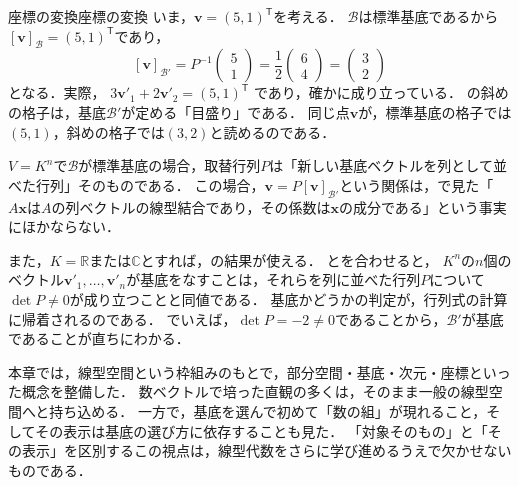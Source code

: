 \begin{example}{座標の変換}{座標の変換}
  いま，$\bm{v} = (5,1)^\mathsf{T}$を考える．
  $\mathcal{B}$は標準基底であるから$[\bm{v}]_{\mathcal{B}} = (5,1)^\mathsf{T}$であり，
  \[
    [\bm{v}]_{\mathcal{B}'}
    = P^{-1}\begin{pmatrix} 5 \\ 1 \end{pmatrix}
    = \frac{1}{2}\begin{pmatrix} 6 \\ 4 \end{pmatrix}
    = \begin{pmatrix} 3 \\ 2 \end{pmatrix}
  \]
  となる．実際，
  $3\bm{v}'_1 + 2\bm{v}'_2 = (5,1)^\mathsf{T}$
  であり，確かに成り立っている．
  の斜めの格子は，基底$\mathcal{B}'$が定める「目盛り」である．
  同じ点$\bm{v}$が，標準基底の格子では$(5,1)$，斜めの格子では$(3,2)$と読めるのである．
\end{example}

\begin{remark}[標準基底の場合と行列式による判定]
  $V = K^n$で$\mathcal{B}$が標準基底の場合，取替行列$P$は「新しい基底ベクトルを列として並べた行列」そのものである．
  この場合，$\bm{v} = P[\bm{v}]_{\mathcal{B}'}$という関係は，で見た「$A\bm{x}$は$A$の列ベクトルの線型結合であり，その係数は$\bm{x}$の成分である」という事実にほかならない．

  また，$K = \mathbb{R}$または$\mathbb{C}$とすれば，の結果が使える．
  とを合わせると，
  $K^n$の$n$個のベクトル$\bm{v}'_1, \dots, \bm{v}'_n$が基底をなすことは，それらを列に並べた行列$P$について$\det P \ne 0$が成り立つことと同値である．
  基底かどうかの判定が，行列式の計算に帰着されるのである．
  でいえば，$\det P=-2\ne0$であることから，$\mathcal{B}'$が基底であることが直ちにわかる．
\end{remark}

本章では，線型空間という枠組みのもとで，部分空間・基底・次元・座標といった概念を整備した．
数ベクトルで培った直観の多くは，そのまま一般の線型空間へと持ち込める．
一方で，基底を選んで初めて「数の組」が現れること，そしてその表示は基底の選び方に依存することも見た．
「対象そのもの」と「その表示」を区別するこの視点は，線型代数をさらに学び進めるうえで欠かせないものである．
